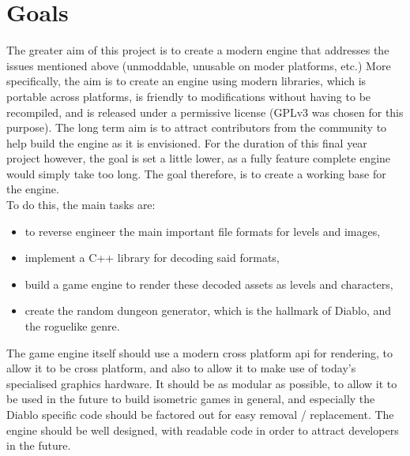 	\section{Goals}	
	The greater aim of this project is to create a modern engine that addresses the issues mentioned above (unmoddable, unusable on moder platforms, etc.) More specifically, the aim is to create an engine using modern libraries, which is portable across platforms, is friendly to modifications without having to be recompiled, and is released under a permissive license (GPLv3 was chosen for this purpose).
	The long term aim is to attract contributors from the community to help build the engine as it is envisioned. For the duration of this final year project however, the goal is set a little lower, as a fully feature complete engine would simply take too long. The goal therefore, is to create a working base for the engine.\\
To do this, the main tasks are:
	\begin{itemize}
		\item to reverse engineer the main important file formats for levels and images,
		\item implement a C++ library for decoding said formats,
		\item build a game engine to render these decoded assets as levels and characters,
		\item create the random dungeon generator, which is the hallmark of Diablo, and the roguelike genre.
	\end{itemize}
	
	The game engine itself should use a modern cross platform api for rendering, to allow it to be cross platform, and also to allow it to make use of today's specialised graphics hardware. It should be as modular as possible, to allow it to be used in the future to build isometric games in general, and especially the Diablo specific code should be factored out for easy removal / replacement.
	The engine should be well designed, with readable code in order to attract developers in the future.
	
